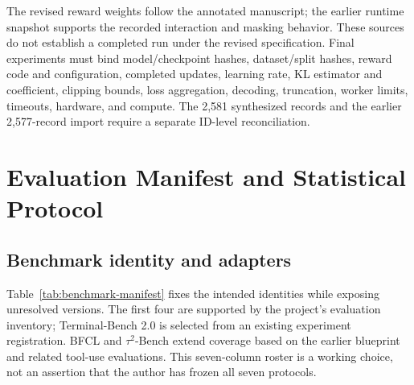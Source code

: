 The revised reward weights follow the annotated manuscript; the earlier runtime snapshot supports the recorded interaction and masking behavior. These sources do not establish a completed run under the revised specification. Final experiments must bind model/checkpoint hashes, dataset/split hashes, reward code and configuration, completed updates, learning rate, KL estimator and coefficient, clipping bounds, loss aggregation, decoding, truncation, worker limits, timeouts, hardware, and compute. The 2,581 synthesized records and the earlier 2,577-record import require a separate ID-level reconciliation.

\section{Evaluation Manifest and Statistical Protocol}
\label{app:benchmarks}

\subsection{Benchmark identity and adapters}

Table~\ref{tab:benchmark-manifest} fixes the intended identities while exposing unresolved versions. The first four are supported by the project's evaluation inventory; Terminal-Bench 2.0 is selected from an existing experiment registration. BFCL and $\tau^2$-Bench extend coverage based on the earlier blueprint and related tool-use evaluations. This seven-column roster is a working choice, not an assertion that the author has frozen all seven protocols.

